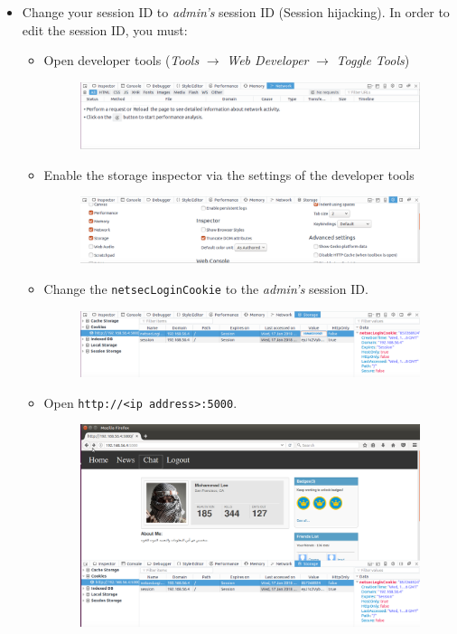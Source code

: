 \documentclass[11pt]{article}
\begin{document}
\begin{itemize}
\item Change your session ID to \textit{admin's} session ID (Session hijacking). In order to edit the session ID, you must:
\begin{itemize}
	\item Open developer tools (\textit{Tools} $\rightarrow$ \textit{Web Developer} $\rightarrow$ \textit{Toggle Tools})
	\begin{figure}[H]
    \includegraphics[width=\linewidth]{images/developerTools.png}
	\end{figure}
	\item Enable the storage inspector via the settings of the developer tools
	\begin{figure}[H]
    \includegraphics[width=\linewidth]{images/storageEnable.png}
	\end{figure}
	\item Change the \texttt{netsecLoginCookie} to the \textit{admin's} session ID.
	\begin{figure}[H]
    \includegraphics[width=\linewidth]{images/changeCookie.png}
	\end{figure}
	\item Open \texttt{http://<ip address>:5000}.
	\begin{figure}[H]
    \includegraphics[width=\linewidth]{images/adminPage.png}
	\end{figure}
\end{itemize}


\end{itemize}
\end{document}
